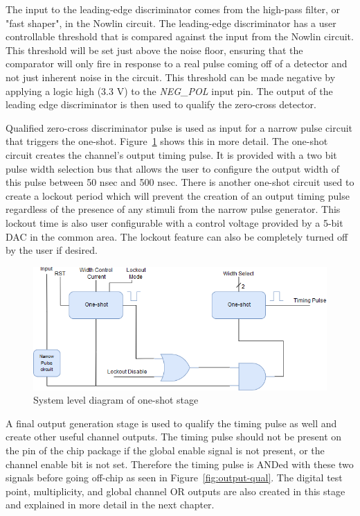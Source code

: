 \documentclass[12pt,oneside,final]{siuethesis}
\theoremstyle{definition}
\begin{document}
\par The input to the leading-edge discriminator comes from the high-pass filter, or "fast shaper", in the Nowlin circuit. The leading-edge discriminator has a user controllable threshold that is compared against the input from the Nowlin circuit. This threshold will be set just above the noise floor, ensuring that the comparator will only fire in response to a real pulse coming off of a detector and not just inherent noise in the circuit. This threshold can be made negative by applying a logic high (3.3 V) to the \emph{NEG\_POL} input pin. The output of the leading edge discriminator is then used to qualify the zero-cross detector.

\par Qualified zero-cross discriminator pulse is used as input for a narrow pulse circuit that triggers the one-shot. Figure~\ref{fig:oneshot} shows this in more detail. The one-shot circuit creates the channel's output timing pulse. It is provided with a two bit pulse width selection bus that allows the user to configure the output width of this pulse between 50 nsec and 500 nsec. There is another one-shot circuit used to create a lockout period which will prevent the creation of an output timing pulse regardless of the presence of any stimuli from the narrow pulse generator. This lockout time is also user configurable with a control voltage provided by a 5-bit DAC in the common area. The lockout feature can also be completely turned off by the user if desired.

\begin{figure}[h!]
\centering
\includegraphics[scale=.65,keepaspectratio=true]{./ch2_figures/oneshot.png} 
\caption{System level diagram of one-shot stage}
\label{fig:oneshot}
\end{figure}

\par A final output generation stage is used to qualify the timing pulse as well and create other useful channel outputs. The timing pulse should not be present on the pin of the chip package if the global enable signal is not present, or the channel enable bit is not set. Therefore the timing pulse is ANDed with these two signals before going off-chip as seen in Figure~\ref{fig:output-qual}. The digital test point, multiplicity, and global channel OR outputs are also created in this stage and explained in more detail in the next chapter.
\end{document}
